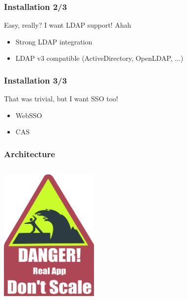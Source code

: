 \documentclass{beamer}
\begin{document}
\begin{frame}
    \frametitle{Installation 2/3}

    \begin{block}{Easy, really? I want LDAP support! Ahah}
        \begin{itemize}
            \item Strong LDAP integration
            \item LDAP v3 compatible (ActiveDirectory, OpenLDAP, ...)
        \end{itemize}
    \end{block}

\end{frame}

\begin{frame}
    \frametitle{Installation 3/3}

    \begin{block}{That was trivial, but I want SSO too!}
        \begin{itemize}
            \item WebSSO
            \item CAS
        \end{itemize}
    \end{block}

\end{frame}

\begin{frame}
    \frametitle{Architecture}

 \begin{columns}
 \begin{column}{0.34\textwidth}
    \includegraphics[height=6.5cm]{pics/scale.pdf}
 \end{column}
 \begin{column}{0.90\textwidth}
 \end{column}
\end{columns}

\end{frame}
\end{document}
